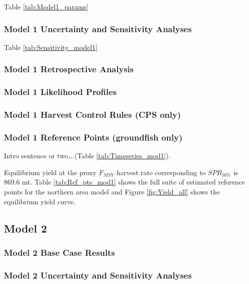 \documentclass[12pt,]{article}
\begin{document}
Table \ref{tab:Model1_params}

\subsubsection{Model 1 Uncertainty and Sensitivity
Analyses}\label{model-1-uncertainty-and-sensitivity-analyses}

Table \ref{tab:Sensitivity_model1}

\subsubsection{Model 1 Retrospective
Analysis}\label{model-1-retrospective-analysis}

\subsubsection{Model 1 Likelihood
Profiles}\label{model-1-likelihood-profiles}

\subsubsection{Model 1 Harvest Control Rules (CPS
only)}\label{model-1-harvest-control-rules-cps-only}

\subsubsection{Model 1 Reference Points (groundfish
only)}\label{model-1-reference-points-groundfish-only}

Intro sentence or two\ldots{}.(Table \ref{tab:Timeseries_mod1}).

Equilibrium yield at the proxy \(F_{MSY}\) harvest rate corresponding to
\(SPR_{50\%}\) is 869.6 mt. Table \ref{tab:Ref_pts_mod1} shows the full
suite of estimated reference points for the northern area model and
Figure \ref{fig:Yield_all} shows the equilibrium yield curve.

\subsection{Model 2}\label{model-2}

\subsubsection{Model 2 Base Case
Results}\label{model-2-base-case-results}

\subsubsection{Model 2 Uncertainty and Sensitivity
Analyses}\label{model-2-uncertainty-and-sensitivity-analyses}
\end{document}
